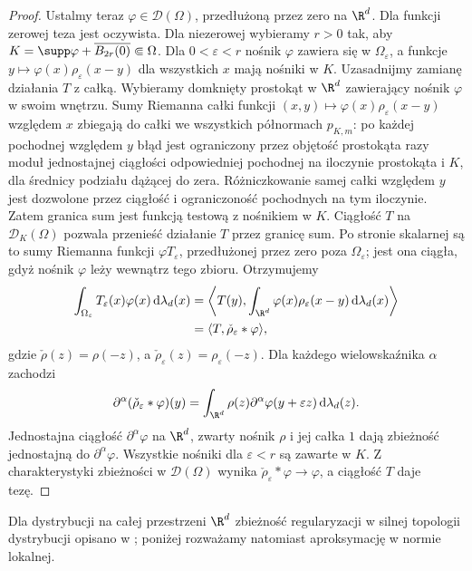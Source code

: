 \begin{proof}
Ustalmy teraz $\varphi\in\mathcal D(\Omega)$,
przedłużoną przez zero na $\R^d$. Dla funkcji
zerowej teza jest oczywista. Dla niezerowej
wybieramy $r>0$ tak, aby
$K=\supp\varphi+\overline{B_{2r}(0)}\Subset\Omega$.
Dla $0<\varepsilon<r$ nośnik $\varphi$
zawiera się w $\Omega_\varepsilon$, a funkcje
$y\mapsto\varphi(x)\rho_\varepsilon(x-y)$
dla wszystkich $x$ mają nośniki w $K$.
Uzasadnijmy zamianę działania $T$ z całką.
Wybieramy domknięty prostokąt w $\R^d$ zawierający
nośnik $\varphi$ w swoim wnętrzu.
Sumy Riemanna całki funkcji
$(x,y)\mapsto\varphi(x)\rho_\varepsilon(x-y)$
względem $x$ zbiegają do całki we wszystkich
półnormach $p_{K,m}$: po każdej pochodnej
względem $y$ błąd jest ograniczony przez objętość
prostokąta razy moduł jednostajnej ciągłości
odpowiedniej pochodnej na iloczynie prostokąta i $K$,
dla średnicy podziału dążącej do zera.
Różniczkowanie samej całki względem $y$
jest dozwolone przez ciągłość i ograniczoność
pochodnych na tym iloczynie.
Zatem granica sum jest funkcją testową z nośnikiem
w $K$. Ciągłość $T$ na $\mathcal D_K(\Omega)$
pozwala przenieść działanie $T$ przez granicę sum.
Po stronie skalarnej są to sumy Riemanna
funkcji $\varphi T_\varepsilon$, przedłużonej przez
zero poza $\Omega_\varepsilon$; jest ona ciągła,
gdyż nośnik $\varphi$ leży wewnątrz tego zbioru.
Otrzymujemy
\[
 \begin{aligned}
 \int_{\Omega_\varepsilon}T_\varepsilon(x)\varphi(x)
 \,\mathrm d\lambda_d(x)
 &=\left\langle T(y),\int_{\R^d}
 \varphi(x)\rho_\varepsilon(x-y)\,\mathrm d\lambda_d(x)
 \right\rangle\\
 &=\langle T,\check\rho_\varepsilon*\varphi\rangle,
 \end{aligned}
\]
gdzie $\check\rho(z)=\rho(-z)$, a
$\check\rho_\varepsilon(z)=\rho_\varepsilon(-z)$.
Dla każdego wielowskaźnika $\alpha$ zachodzi
\[
 \partial^\alpha(\check\rho_\varepsilon*\varphi)(y)
 =\int_{\R^d}\rho(z)\partial^\alpha\varphi(y+\varepsilon z)
 \,\mathrm d\lambda_d(z).
\]
Jednostajna ciągłość $\partial^\alpha\varphi$
na $\R^d$, zwarty nośnik $\rho$ i jej całka $1$
dają zbieżność jednostajną do $\partial^\alpha\varphi$.
Wszystkie nośniki dla $\varepsilon<r$ są zawarte w $K$.
Z charakterystyki zbieżności w $\mathcal D(\Omega)$
wynika $\check\rho_\varepsilon*\varphi\to\varphi$,
a ciągłość $T$ daje tezę.
\end{proof}

Dla dystrybucji na całej przestrzeni $\R^d$ zbieżność regularyzacji w silnej topologii dystrybucji opisano w ; poniżej rozważamy natomiast aproksymację w normie lokalnej.

